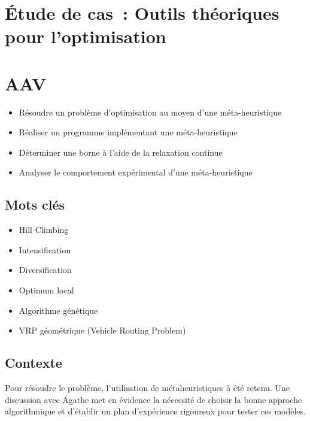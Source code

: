 \newpage
\section*{Étude de cas~: Outils théoriques \\ pour l'optimisation}

\section*{AAV}
\begin{itemize}
	\item [4] Résoudre un problème d'optimisation au moyen d'une méta-heuristique
	\item [3] Réaliser un programme implémentant une méta-heuristique
	\item [3] Déterminer une borne à l'aide de la relaxation continue
	\item [3] Analyser le comportement expérimental d'une méta-heuristique
\end{itemize}

\newpage

\subsection*{Mots clés}
{}
\begin{itemize}
	\item Hill Climbing
	\item Intensification
	\item Diversification
	\item Optimum local
	\item Algorithme génétique
	\item VRP géométrique (Vehicle Routing Problem)
\end{itemize}

\subsection*{Contexte}
{}
\noindent Pour résoudre le problème, l'utilisation de métaheuristiques à été retenu. Une discussion avec Agathe met en évidence la nécessité de choisir la bonne approche algorithmique et d'établir un plan d'expérience rigoureux pour tester ces modèles.

